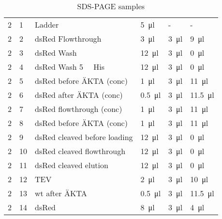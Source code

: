 \begin{table}
\begin{tabu}{llllll}
		2 & 1 & Ladder & \SI{5}{\ul} & - & - \\
		2 & 2 & dsRed Flowthrough & \SI{3}{\ul} & \SI{3}{\ul} & \SI{9}{\ul} \\
		2 & 3 & dsRed Wash & \SI{12}{\ul} & \SI{3}{\ul} & \SI{0}{\ul} \\
		2 & 4 & dsRed Wash \SI{5}{\milli\Molar} His & \SI{12}{\ul} & \SI{3}{\ul} & \SI{0}{\ul} \\
		2 & 5 & dsRed before ÄKTA (conc) & \SI{1}{\ul} & \SI{3}{\ul} & \SI{11}{\ul} \\
		2 & 6 & dsRed after ÄKTA (conc) & \SI{0.5}{\ul} & \SI{3}{\ul} & \SI{11.5}{\ul} \\
		2 & 7 & dsRed flowthrough (conc) & \SI{1}{\ul} & \SI{3}{\ul} & \SI{11}{\ul} \\
		2 & 8 & dsRed before ÄKTA (conc) & \SI{1}{\ul} & \SI{3}{\ul} & \SI{11}{\ul} \\
		2 & 9 & dsRed cleaved before loading & \SI{12}{\ul} & \SI{3}{\ul} & \SI{0}{\ul} \\
		2 & 10 & dsRed cleaved flowthrough & \SI{12}{\ul} & \SI{3}{\ul} & \SI{0}{\ul} \\
		2 & 11 & dsRed cleaved elution & \SI{12}{\ul} & \SI{3}{\ul} & \SI{0}{\ul} \\
		2 & 12 & TEV & \SI{2}{\ul} & \SI{3}{\ul} & \SI{10}{\ul} \\
		2 & 13 & wt after ÄKTA & \SI{0.5}{\ul} & \SI{3}{\ul} & \SI{11.5}{\ul} \\
		2 & 14 & dsRed & \SI{8}{\ul} & \SI{3}{\ul} & \SI{4}{\ul} \\
		\bottomrule
	\end{tabu}
	\caption{SDS-PAGE samples}
	\label{tbl:sds_samples}
\end{table}


